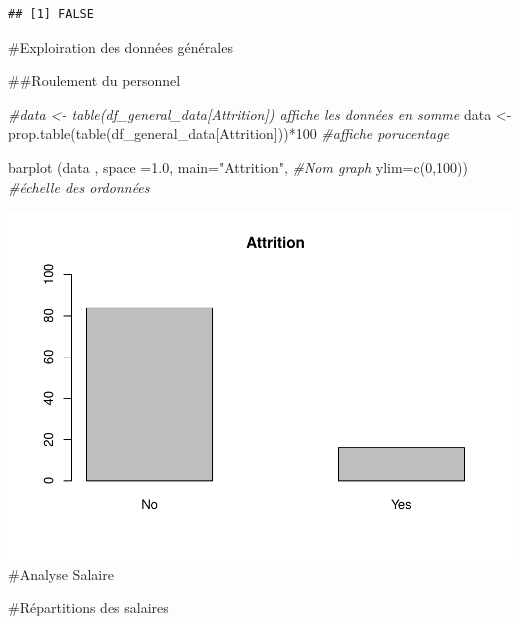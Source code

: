 \documentclass[
]{article}
\newenvironment{Shaded}{\begin{snugshade}}{\end{snugshade}}
\newcommand{\AttributeTok}[1]{\textcolor[rgb]{0.77,0.63,0.00}{#1}}
\newcommand{\CommentTok}[1]{\textcolor[rgb]{0.56,0.35,0.01}{\textit{#1}}}
\newcommand{\DecValTok}[1]{\textcolor[rgb]{0.00,0.00,0.81}{#1}}
\newcommand{\FloatTok}[1]{\textcolor[rgb]{0.00,0.00,0.81}{#1}}
\newcommand{\FunctionTok}[1]{\textcolor[rgb]{0.00,0.00,0.00}{#1}}
\newcommand{\NormalTok}[1]{#1}
\newcommand{\OtherTok}[1]{\textcolor[rgb]{0.56,0.35,0.01}{#1}}
\newcommand{\SpecialCharTok}[1]{\textcolor[rgb]{0.00,0.00,0.00}{#1}}
\newcommand{\StringTok}[1]{\textcolor[rgb]{0.31,0.60,0.02}{#1}}
\begin{document}
\begin{verbatim}
## [1] FALSE
\end{verbatim}

\#Exploiration des données générales

\#\#Roulement du personnel

\begin{Shaded}
\begin{Highlighting}[]
\CommentTok{\#data \textless{}{-} table(df\_general\_data[\textquotesingle{}Attrition\textquotesingle{}])   affiche les données en somme }
\NormalTok{data }\OtherTok{\textless{}{-}} \FunctionTok{prop.table}\NormalTok{(}\FunctionTok{table}\NormalTok{(df\_general\_data[}\StringTok{\textquotesingle{}Attrition\textquotesingle{}}\NormalTok{]))}\SpecialCharTok{*}\DecValTok{100}   \CommentTok{\#affiche porucentage }


\FunctionTok{barplot}\NormalTok{ (data , }\AttributeTok{space =}\FloatTok{1.0}\NormalTok{,}
         \AttributeTok{main=}\StringTok{"Attrition"}\NormalTok{,  }\CommentTok{\#Nom graph}
         \AttributeTok{ylim=}\FunctionTok{c}\NormalTok{(}\DecValTok{0}\NormalTok{,}\DecValTok{100}\NormalTok{))     }\CommentTok{\#échelle des ordonnées}
\end{Highlighting}
\end{Shaded}

\includegraphics{Projet_files/figure-latex/unnamed-chunk-9-1.pdf}
\#Analyse Salaire

\#Répartitions des salaires

\begin{Shaded}
\end{Shaded}
\end{document}
